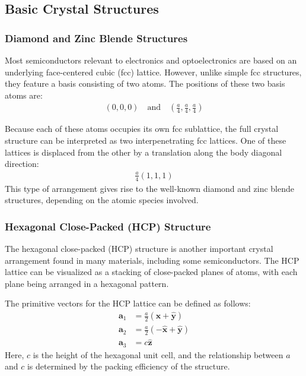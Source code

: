 \subsection{Basic Crystal Structures}
\subsubsection{Diamond and Zinc Blende Structures}
Most semiconductors relevant to electronics and optoelectronics are based on an underlying face-centered cubic (fcc) lattice. However, unlike simple fcc structures, they feature a basis consisting of two atoms. The positions of these two basis atoms are:
\begin{align*}
	(0, 0, 0) \quad \text{and} \quad \left( \frac{a}{4}, \frac{a}{4}, \frac{a}{4} \right)
\end{align*}

Because each of these atoms occupies its own fcc sublattice, the full crystal structure can be interpreted as two interpenetrating fcc lattices. One of these lattices is displaced from the other by a translation along the body diagonal direction:
\begin{align*}
	\frac{a}{4}(1, 1, 1)
\end{align*}
This type of arrangement gives rise to the well-known diamond and zinc blende structures, depending on the atomic species involved.

\subsubsection{Hexagonal Close-Packed (HCP) Structure}
The hexagonal close-packed (HCP) structure is another important crystal arrangement found in many materials, including some semiconductors. The HCP lattice can be visualized as a stacking of close-packed planes of atoms, with each plane being arranged in a hexagonal pattern.

The primitive vectors for the HCP lattice can be defined as follows:
\begin{align*}
	\mathbf{a}_1 & = \frac{a}{2} (\hat{\mathbf{x}} + \hat{\mathbf{y}})  \\
	\mathbf{a}_2 & = \frac{a}{2} (-\hat{\mathbf{x}} + \hat{\mathbf{y}}) \\
	\mathbf{a}_3 & = c \hat{\mathbf{z}}
\end{align*}
Here, \(c\) is the height of the hexagonal unit cell, and the relationship between \(a\) and \(c\) is determined by the packing efficiency of the structure.

